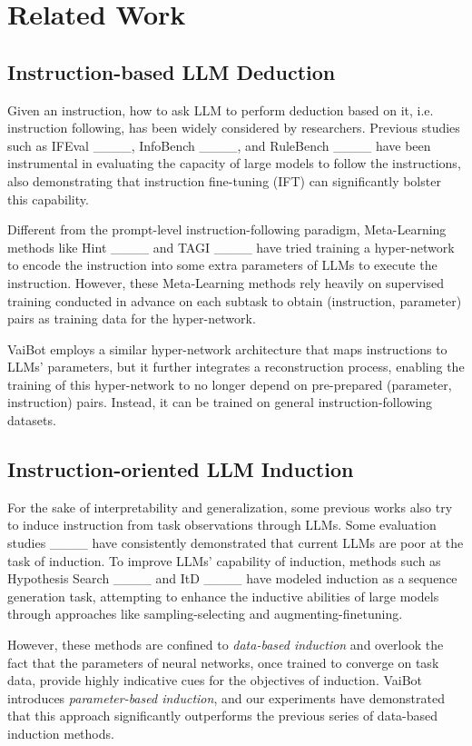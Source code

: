 \section{Related Work}
\label{sec:related_work}
\subsection{Instruction-based LLM Deduction}
\label{sec:deduction_related_work}
Given an instruction, how to ask LLM to perform deduction based on it, i.e. instruction following, has been widely considered by researchers. Previous studies such as IFEval ____, InfoBench ____, and RuleBench ____ have been instrumental in evaluating the capacity of large models to follow the instructions, also demonstrating that instruction fine-tuning (IFT) can significantly bolster this capability. 

Different from the prompt-level instruction-following paradigm, Meta-Learning methods like Hint ____ and TAGI ____ have tried training a hyper-network to encode the instruction into some extra parameters of LLMs to execute the instruction. However, these Meta-Learning methods rely heavily on supervised training conducted in advance on each subtask to obtain (instruction, parameter) pairs as training data for the hyper-network.

VaiBot employs a similar hyper-network architecture that maps instructions to LLMs' parameters, but it further integrates a reconstruction process, enabling the training of this hyper-network to no longer depend on pre-prepared (parameter, instruction) pairs. Instead, it can be trained on general instruction-following datasets.

\subsection{Instruction-oriented LLM Induction}
\label{sec:induction_related_work}
For the sake of interpretability and generalization, some previous works also try to induce instruction from task observations through LLMs. Some evaluation studies ____ have consistently demonstrated that current LLMs are poor at the task of induction. To improve LLMs' capability of induction, methods such as Hypothesis Search ____ and ItD ____ have modeled induction as a sequence generation task, attempting to enhance the inductive abilities of large models through approaches like sampling-selecting and augmenting-finetuning.

However, these methods are confined to \emph{data-based induction} and overlook the fact that the parameters of neural networks, once trained to converge on task data, provide highly indicative cues for the objectives of induction. VaiBot introduces \emph{parameter-based induction}, and our experiments have demonstrated that this approach significantly outperforms the previous series of data-based induction methods.
